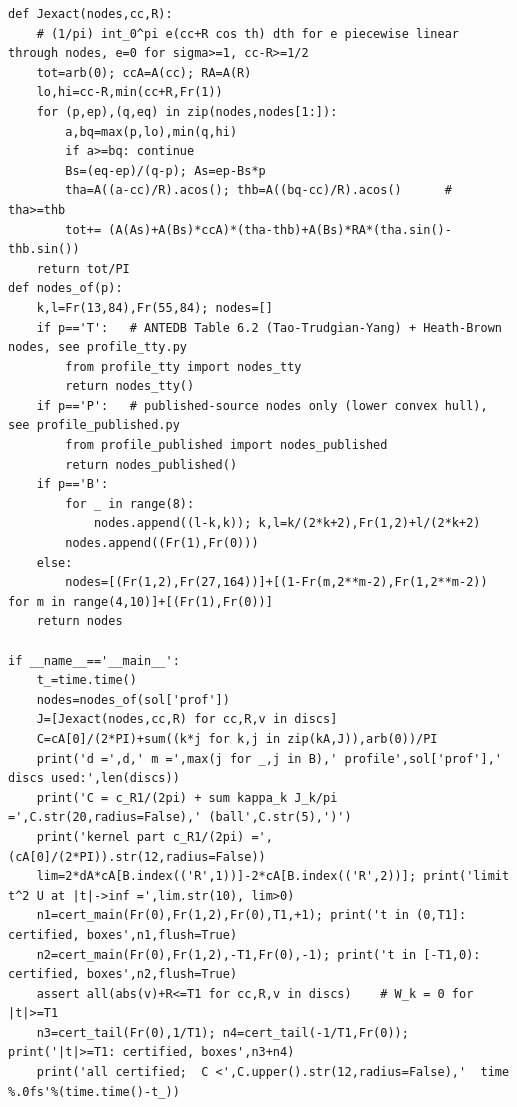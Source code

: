 \documentclass[11pt,reqno]{amsart}
\numberwithin{equation}{section}
\theoremstyle{definition}
\theoremstyle{remark}
\begin{document}
\begin{lstlisting}
def Jexact(nodes,cc,R):
    # (1/pi) int_0^pi e(cc+R cos th) dth for e piecewise linear through nodes, e=0 for sigma>=1, cc-R>=1/2
    tot=arb(0); ccA=A(cc); RA=A(R)
    lo,hi=cc-R,min(cc+R,Fr(1))
    for (p,ep),(q,eq) in zip(nodes,nodes[1:]):
        a,bq=max(p,lo),min(q,hi)
        if a>=bq: continue
        Bs=(eq-ep)/(q-p); As=ep-Bs*p
        tha=A((a-cc)/R).acos(); thb=A((bq-cc)/R).acos()      # tha>=thb
        tot+= (A(As)+A(Bs)*ccA)*(tha-thb)+A(Bs)*RA*(tha.sin()-thb.sin())
    return tot/PI
def nodes_of(p):
    k,l=Fr(13,84),Fr(55,84); nodes=[]
    if p=='T':   # ANTEDB Table 6.2 (Tao-Trudgian-Yang) + Heath-Brown nodes, see profile_tty.py
        from profile_tty import nodes_tty
        return nodes_tty()
    if p=='P':   # published-source nodes only (lower convex hull), see profile_published.py
        from profile_published import nodes_published
        return nodes_published()
    if p=='B':
        for _ in range(8):
            nodes.append((l-k,k)); k,l=k/(2*k+2),Fr(1,2)+l/(2*k+2)
        nodes.append((Fr(1),Fr(0)))
    else:
        nodes=[(Fr(1,2),Fr(27,164))]+[(1-Fr(m,2**m-2),Fr(1,2**m-2)) for m in range(4,10)]+[(Fr(1),Fr(0))]
    return nodes

if __name__=='__main__':
    t_=time.time()
    nodes=nodes_of(sol['prof'])
    J=[Jexact(nodes,cc,R) for cc,R,v in discs]
    C=cA[0]/(2*PI)+sum((k*j for k,j in zip(kA,J)),arb(0))/PI
    print('d =',d,' m =',max(j for _,j in B),' profile',sol['prof'],' discs used:',len(discs))
    print('C = c_R1/(2pi) + sum kappa_k J_k/pi =',C.str(20,radius=False),' (ball',C.str(5),')')
    print('kernel part c_R1/(2pi) =',(cA[0]/(2*PI)).str(12,radius=False))
    lim=2*dA*cA[B.index(('R',1))]-2*cA[B.index(('R',2))]; print('limit t^2 U at |t|->inf =',lim.str(10), lim>0)
    n1=cert_main(Fr(0),Fr(1,2),Fr(0),T1,+1); print('t in (0,T1]: certified, boxes',n1,flush=True)
    n2=cert_main(Fr(0),Fr(1,2),-T1,Fr(0),-1); print('t in [-T1,0): certified, boxes',n2,flush=True)
    assert all(abs(v)+R<=T1 for cc,R,v in discs)    # W_k = 0 for |t|>=T1
    n3=cert_tail(Fr(0),1/T1); n4=cert_tail(-1/T1,Fr(0)); print('|t|>=T1: certified, boxes',n3+n4)
    print('all certified;  C <',C.upper().str(12,radius=False),'  time %.0fs'%(time.time()-t_))
\end{lstlisting}
\end{document}
